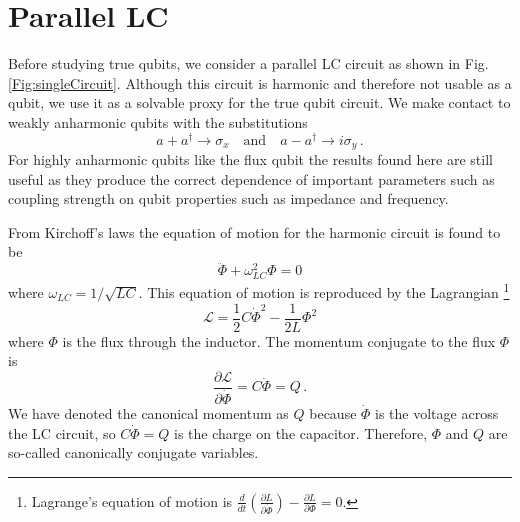 \section{Parallel LC}

Before studying true qubits, we consider a parallel LC circuit as shown in Fig.\,\ref{Fig:singleCircuit}.
Although this circuit is harmonic and therefore not usable as a qubit, we use it as a solvable proxy for the true qubit circuit.
We make contact to weakly anharmonic qubits with the substitutions
\begin{equation}
a+a^\dagger \rightarrow \sigma_x \quad \textrm{and} \quad a-a^\dagger \rightarrow i \sigma_y \, .
\end{equation}
For highly anharmonic qubits like the flux qubit the results found here are still useful as they produce the correct dependence of important parameters such as coupling strength on qubit properties such as impedance and frequency.

From Kirchoff's laws the equation of motion for the harmonic circuit is found to be \begin{equation}
\ddot{\Phi} + \omega_{LC}^2 \Phi = 0 \end{equation}
where $\omega_{LC}=1/\sqrt{LC}$. This equation of motion is reproduced by the Lagrangian \footnote{Lagrange's equation of motion is $\frac{d}{dt}\left( \frac{\partial L}{\partial \dot{\Phi}} \right) - \frac{\partial L}{\partial \Phi} = 0$.} \begin{equation}
\mathcal{L} = \frac{1}{2}C\dot{\Phi}^2 - \frac{1}{2L}\Phi^2 \end{equation}
where $\Phi$ is the flux through the inductor. The momentum conjugate to the flux $\Phi$ is
\begin{equation}
\frac{\partial \mathcal{L}}{\partial \dot{\Phi}} = C\dot{\Phi} = Q \, .
\end{equation}
We have denoted the canonical momentum as $Q$ because $\dot{\Phi}$ is the voltage across the LC circuit, so $C \dot{\Phi} = Q$ is the charge on the capacitor.
Therefore, $\Phi$ and $Q$ are so-called canonically conjugate variables.

